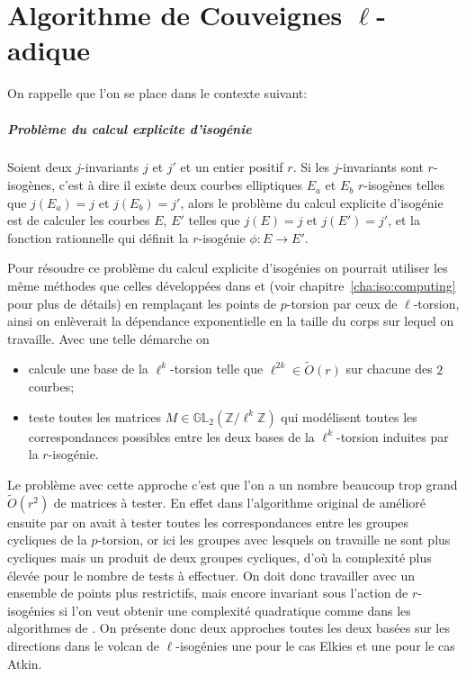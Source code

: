 \documentclass[10pt,a4paper]{book}
\theoremstyle{plain}
\theoremstyle{definition}
\theoremstyle{definition}
\theoremstyle{definition}
\theoremstyle{definition}
\theoremstyle{remark}
\theoremstyle{remark}
\theoremstyle{definition}
\begin{document}
\chapter{Algorithme de Couveignes $\ell$-adique}
\label{cha:alg:fin}
On rappelle que l'on se place dans le contexte suivant: 

\paragraph{Problème du calcul explicite d'isogénie} \label{prob:isogeny-problem}

Soient deux $j$-invariants $j$ et $j'$ et un entier positif $r$. Si les $j$-invariants sont $r$-isogènes, c'est à dire il existe deux courbes elliptiques $E_a$ et $E_b$ $r$-isogènes telles que $j(E_a)=j$ et $j(E_b)=j'$, alors le problème du calcul explicite d'isogénie est de calculer les courbes $E$, $E'$ telles que $j(E)=j$ et $j(E')=j'$, et la fonction rationnelle qui définit la $r$-isogénie $\phi:E \rightarrow E'$.


Pour résoudre ce problème du calcul explicite d'isogénies on pourrait utiliser 
les même méthodes que celles développées dans \cite{Couveignes96} et 
\cite{DeFeo11} (voir chapitre~\ref{cha:iso:computing} pour plus de détails) en 
remplaçant les points de $p$-torsion par ceux de $\ell$-torsion, ainsi on 
enlèverait la dépendance exponentielle en la taille du corps sur lequel on 
travaille. Avec une telle démarche on 
\begin{itemize}
\item calcule une base de la $\ell^k$-torsion telle que $\ell^{2k} \in \tilde 
O(r)$ sur chacune des $2$ courbes;
\item teste toutes les matrices $M \in \mathbb{GL}_2(\mathbb{Z}/\ell^k
\mathbb{Z})$ qui modélisent toutes les correspondances possibles entre les 
deux bases de la $\ell^k$-torsion induites par la $r$-isogénie.
\end{itemize}
Le problème avec cette approche c'est que l'on a un nombre beaucoup trop grand
$\tilde O(r^2)$ de matrices à tester. En effet dans l'algorithme original de 
\cite{Couveignes96} amélioré ensuite par \cite{DeFeo11} on avait à tester 
toutes les correspondances entre les groupes cycliques de la $p$-torsion, or 
ici les groupes avec lesquels on travaille ne sont plus cycliques mais un 
produit de deux groupes cycliques, d'où la complexité plus élevée pour le nombre 
de tests à effectuer. On doit donc travailler avec un ensemble de 
points plus restrictifs, mais encore invariant sous l'action de $r$-isogénies 
si l'on veut obtenir une complexité quadratique comme dans
les algorithmes de \cite{DeFeo11}. On présente donc deux approches toutes les 
deux basées sur les directions dans le volcan de $\ell$-isogénies une pour le 
cas Elkies et une pour le cas Atkin.
\end{document}
